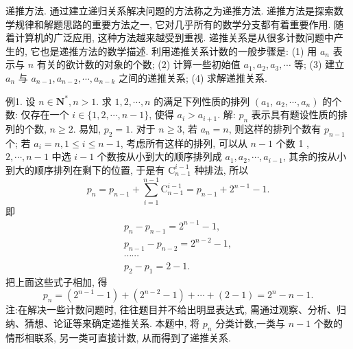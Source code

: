 
递推方法.
通过建立递归关系解决问题的方法称之为递推方法.
递推方法是探索数学规律和解题思路的重要方法之一, 它对几乎所有的数学分支都有着重要作用.
随着计算机的广泛应用, 这种方法越来越受到重视.
递推关系是从很多计数问题中产生的, 它也是递推方法的数学描述.
利用递推关系计数的一般步骤是:
(1) 用 $a_n$ 表示与 $n$ 有关的欲计数的对象的个数;
(2) 计算一些初始值 $a_1, a_2, a_3, \cdots$ 等;
(3) 建立 $a_n$ 与 $a_{n-1}, a_{n-2}, \cdots, a_{n-k}$ 之间的递推关系;
(4) 求解递推关系.



例1. 设 $n \in \mathbf{N}^*, n>1$. 求 $1,2, \cdots, n$ 的满足下列性质的排列 $\left(a_1\right.$, $\left.a_2, \cdots, a_n\right)$ 的个数: 仅存在一个 $i \in\{1,2, \cdots, n-1\}$, 使得 $a_i>a_{i+1}$.
解: $p_n$ 表示具有题设性质的排列的个数, $n \geqslant 2$. 易知, $p_2=1$.
对于 $n \geqslant 3$, 若 $a_n=n$, 则这样的排列个数有 $p_{n-1}$ 个;
若 $a_i=n, 1 \leqslant i \leqslant n-1$, 考虑所有这样的排列, 可以从 $n-1$ 个数 1 , $2, \cdots, n-1$ 中选 $i-1$ 个数按从小到大的顺序排列成 $a_1, a_2, \cdots, a_{i-1}$, 其余的按从小到大的顺序排列在剩下的位置, 于是有 $\mathrm{C}_{n-1}^{i-1}$ 种排法, 所以
$$
p_n=p_{n-1}+\sum_{i=1}^{n-1} \mathrm{C}_{n-1}^{i-1}=p_{n-1}+2^{n-1}-1 .
$$
即
$$
\begin{gathered}
p_n-p_{n-1}=2^{n-1}-1, \\
p_{n-1}-p_{n-2}=2^{n-2}-1, \\
\cdots \cdots \\
p_2-p_1=2-1 .
\end{gathered}
$$
把上面这些式子相加, 得
$$
p_n=\left(2^{n-1}-1\right)+\left(2^{n-2}-1\right)+\cdots+(2-1)=2^n-n-1 .
$$
注:在解决一些计数问题时, 往往题目并不给出明显表达式, 需通过观察、分析、归纳、猜想、论证等来确定递推关系.
本题中, 将 $p_n$ 分类计数,一类与 $n-1$ 个数的情形相联系, 另一类可直接计数, 从而得到了递推关系.



